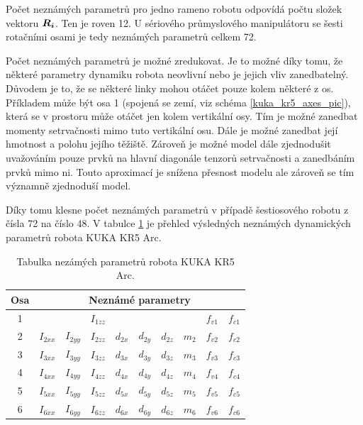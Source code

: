 Počet neznámých parametrů pro jedno rameno robotu odpovídá počtu složek vektoru $\boldsymbol{R_i}$. Ten je roven 12. U sériového průmyslového manipulátoru se šesti rotačními osami je tedy neznámých parametrů celkem 72. 

Počet neznámých parametrů je možné zredukovat. Je to možné díky tomu, že některé parametry dynamiku robota neovlivní nebo je jejich vliv zanedbatelný. Důvodem je to, že se některé linky mohou otáčet pouze kolem některé z os. Příkladem může být osa 1 (spojená se zemí, viz schéma \ref{kuka_kr5_axes_pic}), která se v prostoru může otáčet jen kolem vertikální osy. Tím je možné zanedbat momenty setrvačnosti mimo tuto vertikální osu. Dále je možné zanedbat její hmotnost a polohu jejího těžiště. Zároveň je možné model dále zjednodušit uvažováním pouze prvků na hlavní diagonále tenzorů setrvačnosti a zanedbáním prvků mimo ni. Touto aproximací je snížena přesnost modelu ale zároveň se tím významně zjednoduší model.

Díky tomu klesne počet neznámých parametrů v případě šestiosového robotu z čísla 72 na číslo 48. V tabulce \ref{tab_hled_param} je přehled výsledných neznámých dynamických parametrů robota KUKA KR5 Arc.
\\

\begin{table}[ht]
  \centering
  \caption{Tabulka nezámých parametrů robota KUKA KR5 Arc.}
    \begin{tabular}{c|lllllllll}
    \multicolumn{1}{c|}{Osa} & \multicolumn{9}{c}{Neznámé parametry}  \\
    \hline
    1 &       	  &	          & $I_{1zz}$ &          &          &          & & $f_{v1}$ & $f_{c1}$ \\
    2 & $I_{2xx}$ & $I_{2yy}$ & $I_{2zz}$ & $d_{2x}$ & $d_{2y}$ & $d_{2z}$ & $m_{2}$ & $f_{v2}$ & $f_{c2}$ \\
    3 & $I_{3xx}$ & $I_{3yy}$ & $I_{3zz}$ & $d_{3x}$ & $d_{3y}$ & $d_{3z}$ & $m_{3}$ & $f_{v3}$ & $f_{c3}$ \\
    4 & $I_{4xx}$ & $I_{4yy}$ & $I_{4zz}$ & $d_{4x}$ & $d_{4y}$ & $d_{4z}$ & $m_{4}$ & $f_{v4}$ & $f_{c4}$ \\
    5 & $I_{5xx}$ & $I_{5yy}$ & $I_{5zz}$ & $d_{5x}$ & $d_{5y}$ & $d_{5z}$ & $m_{5}$ & $f_{v5}$ & $f_{c5}$ \\
    6 & $I_{6xx}$ & $I_{6yy}$ & $I_{6zz}$ & $d_{6x}$ & $d_{6y}$ & $d_{6z}$ & $m_{6}$ & $f_{v6}$ & $f_{c6}$ \\
    \end{tabular}%
  \label{tab_hled_param}%
\end{table}%


